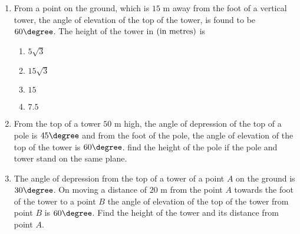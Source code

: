 \begin{enumerate}
\item From a point on the ground, which is $15\text{ m}$ away from the foot of a vertical tower, the angle of elevation of the top of the tower, is found to be $60\degree$. The height of the tower in $\left(\text{in metres}\right)$ is\\
\begin{enumerate}
\item $5\sqrt 3$\\
\item $15\sqrt 3$\\
\item $15$\\
\item $7.5$\\
\end{enumerate}
\item From the top of a tower $50\text{ m}$ high, the angle of depression of the top of a pole is $45\degree$ and from the foot of the pole, the angle of elevation of the top of the tower is $60\degree$. find the height of the pole if the pole and tower stand on the same plane.\\
\item The angle of depression from the top of a tower of a point $A$ on the ground is $30\degree$. On moving a distance of $20\text{ m}$ from the point $A$ towards the foot of the tower to a point $B$ the angle of elevation of the top of the tower from point $B$ is $60\degree$. Find the height of the tower and its distance from point $A$.
\end{enumerate}
